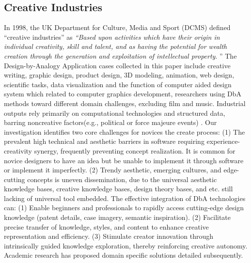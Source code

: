 \subsection{Creative Industries} %
In 1998, the UK Department for Culture, Media and Sport (DCMS) defined ``creative industries'' as \textit{``Based upon activities which have their origin in individual creativity, skill and talent, and as having the potential for wealth creation through the generation and exploitation of intellectual property}\cite{miles2008hidden}. '' The Design-by-Analogy Application cases collected in this paper include creative writing, graphic design, product design, 3D modeling, animation, web design, scientific tasks, data visualization and the function of computer aided design system which related to computer graphics development, researchers using DbA methods toward different domain challenges, excluding film and music. Industrial outputs rely primarily on computational technologies and structured data, barring noncreative factors(e.g., political or force majeure events) \cite{miles2008hidden}. Our investigation identifies two core challenges for novices the create process: (1) The prevalent high technical and aesthetic barriers in software requiring experience-creativity synergy, frequently preventing concept realization\cite{hsueh2024counts}. It is common for novice designers to have an idea but be unable to implement it through software or implement it imperfectly. (2) Trendy aesthetic, emerging cultures, and edge-cutting concepts is uneven dissemination, due to the universal aesthetic knowledge bases, creative knowledge bases, design theory bases, and etc. still lacking of universal tool embedded. The effective integration of DbA technologies can: (1) Enable beginners and professionals to rapidly access cutting-edge design knowledge (patent details, case imagery, semantic inspiration). (2) Facilitate precise transfer of knowledge, styles, and content to enhance creative representation and efficiency. (3) Stimulate creator innovation through intrinsically guided knowledge exploration, thereby reinforcing creative autonomy. Academic research\cite{srinivasan2024improving, masson2025textoshop, warner2023interactive, chen2024beyond,wang2024reelframer, zheng2024disciplink,yan2023xcreation,chen2021umitation, kittur2019scaling, goucher2019crowdsourcing, han2018computational, lin2025inkspire, song2020exploration} has proposed domain specific solutions detailed subsequently.


